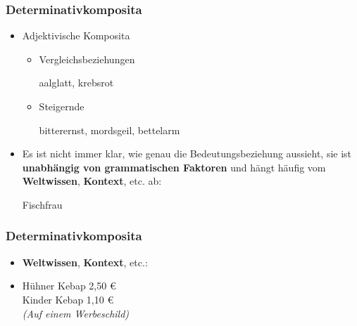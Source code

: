 \begin{frame}
\frametitle{Determinativkomposita}

\begin{itemize}
	\item Adjektivische Komposita
	
	\begin{itemize}
		\item Vergleichsbeziehungen
		
		\ea aalglatt, krebsrot
		\z
		
		\item Steigernde
		
		\ea bitterernst, mordsgeil, bettelarm
		\z
		
	\end{itemize}
	
	\item Es ist nicht immer klar, wie genau die Bedeutungsbeziehung aussieht, sie ist \textbf{unabhängig von grammatischen Faktoren} und hängt häufig vom \textbf{Weltwissen}, \textbf{Kontext}, etc. ab:
	
	\ea Fischfrau
	\z
	
\end{itemize}


\end{frame}


\begin{frame}
\frametitle{Determinativkomposita}

\begin{itemize}
	\item \textbf{Weltwissen}, \textbf{Kontext}, etc.:
	\item[] Hühner Kebap 2,50 €\\
	Kinder Kebap 1,10 €\\
	\emph{(Auf einem Werbeschild)}
\end{itemize}


\end{frame}


